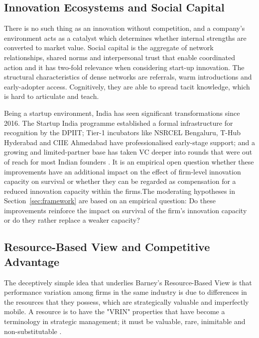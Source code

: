 \documentclass{ieeeaccess}
\begin{document}
\subsection{Innovation Ecosystems and Social Capital}

There is no such thing as an innovation without competition, and a company's environment acts as a catalyst which determines whether internal strengths are converted to market value. Social capital is the aggregate of network relationships, shared norms and interpersonal trust that enable coordinated action \cite{b15} and it has two-fold relevance when considering start-up innovation. The structural characteristics of dense networks are referrals, warm introductions and early-adopter access. Cognitively, they are able to spread tacit knowledge, which is hard to articulate and teach.

Being a startup environment, India has seen significant transformations since 2016. The Startup India programme established a formal infrastructure for recognition by the DPIIT; Tier-1 incubators like NSRCEL Bengaluru, T-Hub Hyderabad and CIIE Ahmedabad have professionalised early-stage support; and a growing and limited-partner base has taken VC deeper into rounds that were out of reach for most Indian founders \cite{b2}. It is an empirical open question whether these improvements have an additional impact on the effect of firm-level innovation capacity on survival or whether they can be regarded as compensation for a reduced innovation capacity within the firms.The moderating hypotheses in Section~\ref{sec:framework} are based on an empirical question: Do these improvements reinforce the impact on survival of the firm's innovation capacity or do they rather replace a weaker capacity?

\subsection{Resource-Based View and Competitive Advantage}

The deceptively simple idea that underlies Barney's \cite{b11} Resource-Based View is that performance variation among firms in the same industry is due to differences in the resources that they possess, which are strategically valuable and imperfectly mobile. A resource is to have the "VRIN" properties that have become a terminology in strategic management; it must be valuable, rare, inimitable and non-substitutable \cite{b16}.
\end{document}
